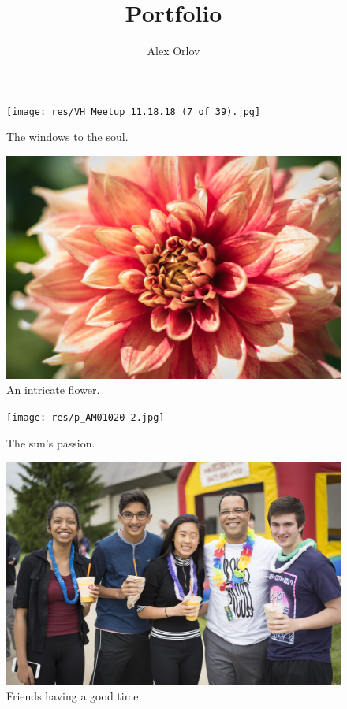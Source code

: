 \documentclass{report}
\title{Portfolio}
\author{Alex Orlov}
\date{}
\begin{document}
\maketitle

\begin{figure}
  \texttt{[image: res/VH\_Meetup\_11.18.18\_(7\_of\_39).jpg]}
  \caption{The windows to the soul.}
\end{figure}

\begin{figure}
  \includegraphics[width=\linewidth]{res/flowermacro.jpg}
  \caption{An intricate flower.}
\end{figure}

\begin{figure}
  \texttt{[image: res/p\_AM01020-2.jpg]}
  \caption{The sun's passion.}
\end{figure}

\begin{figure}
  \includegraphics[width=\linewidth]{res/groupluau.jpg}
  \caption{Friends having a good time.}
\end{figure}
\end{document}
